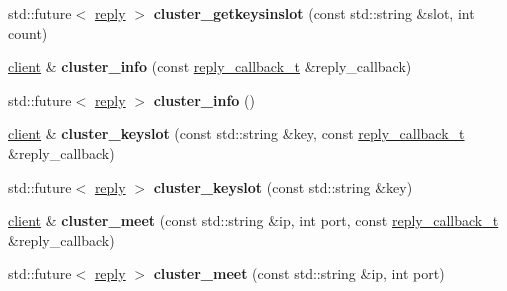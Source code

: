 \begin{DoxyCompactItemize}
\item 
\mbox{\label{classcpp__redis_1_1client_ad644ef5c24f3eb51de30a827753cc077}} 
std\+::future$<$ \hyperlink{classcpp__redis_1_1reply}{reply} $>$ {\bfseries cluster\+\_\+getkeysinslot} (const std\+::string \&slot, int count)
\item 
\mbox{\label{classcpp__redis_1_1client_a831d52a9dc9115e817bae15db0fb18a6}} 
\hyperlink{classcpp__redis_1_1client}{client} \& {\bfseries cluster\+\_\+info} (const \hyperlink{classcpp__redis_1_1client_a061a1140d36d2eaeda82b09a0bb3f9f2}{reply\+\_\+callback\+\_\+t} \&reply\+\_\+callback)
\item 
\mbox{\label{classcpp__redis_1_1client_a993170e08c425a810fa757bd4c202d10}} 
std\+::future$<$ \hyperlink{classcpp__redis_1_1reply}{reply} $>$ {\bfseries cluster\+\_\+info} ()
\item 
\mbox{\label{classcpp__redis_1_1client_ae0314fc2697674f4be4fca1cc5cbd4a1}} 
\hyperlink{classcpp__redis_1_1client}{client} \& {\bfseries cluster\+\_\+keyslot} (const std\+::string \&key, const \hyperlink{classcpp__redis_1_1client_a061a1140d36d2eaeda82b09a0bb3f9f2}{reply\+\_\+callback\+\_\+t} \&reply\+\_\+callback)
\item 
\mbox{\label{classcpp__redis_1_1client_a5681ac2dfdacc19cde1a828d8b801df1}} 
std\+::future$<$ \hyperlink{classcpp__redis_1_1reply}{reply} $>$ {\bfseries cluster\+\_\+keyslot} (const std\+::string \&key)
\item 
\mbox{\label{classcpp__redis_1_1client_aefc94be1dc7eb11673ba92bc8cbffdcf}} 
\hyperlink{classcpp__redis_1_1client}{client} \& {\bfseries cluster\+\_\+meet} (const std\+::string \&ip, int port, const \hyperlink{classcpp__redis_1_1client_a061a1140d36d2eaeda82b09a0bb3f9f2}{reply\+\_\+callback\+\_\+t} \&reply\+\_\+callback)
\item 
\mbox{\label{classcpp__redis_1_1client_af142b166d5f88f76f5fd46e6e33c0523}} 
std\+::future$<$ \hyperlink{classcpp__redis_1_1reply}{reply} $>$ {\bfseries cluster\+\_\+meet} (const std\+::string \&ip, int port)
\item 

\end{DoxyCompactItemize}
